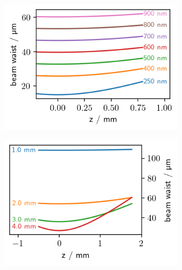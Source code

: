 \documentclass[twoside,openright]{scrreprt}
\begin{document}
\begin{figure}[h]
\centering
\begin{subfigure}[t]{0.42\textwidth}
\centering
\includegraphics[width =\textwidth]{images/BeamWaist_Wavs_2.5mm.png} 
\end{subfigure}
\hfill
\begin{subfigure}[t]{0.42\textwidth}
\centering
\includegraphics[width =\textwidth]{images/BeamWaist_inputWidth_653nm.png} 
\end{subfigure}
\\
\begin{subfigure}[t]{0.5\textwidth}

\end{subfigure}
\end{figure}
\end{document}
